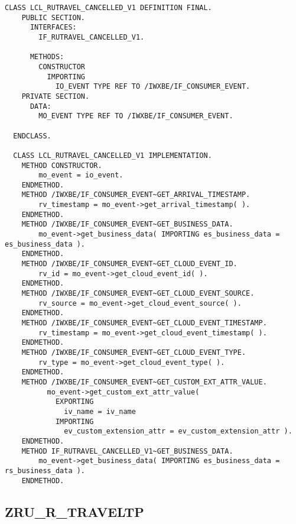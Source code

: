 \begin{Verbatim}[breaklines=true]
    CLASS LCL_RUTRAVEL_CANCELLED_V1 DEFINITION FINAL.
    PUBLIC SECTION.
      INTERFACES:
        IF_RUTRAVEL_CANCELLED_V1.
  
      METHODS:
        CONSTRUCTOR
          IMPORTING
            IO_EVENT TYPE REF TO /IWXBE/IF_CONSUMER_EVENT.
    PRIVATE SECTION.
      DATA:
        MO_EVENT TYPE REF TO /IWXBE/IF_CONSUMER_EVENT.
  
  ENDCLASS.
  
  CLASS LCL_RUTRAVEL_CANCELLED_V1 IMPLEMENTATION.
    METHOD CONSTRUCTOR.
        mo_event = io_event.
    ENDMETHOD.
    METHOD /IWXBE/IF_CONSUMER_EVENT~GET_ARRIVAL_TIMESTAMP.
        rv_timestamp = mo_event->get_arrival_timestamp( ).
    ENDMETHOD.
    METHOD /IWXBE/IF_CONSUMER_EVENT~GET_BUSINESS_DATA.
        mo_event->get_business_data( IMPORTING es_business_data = es_business_data ).
    ENDMETHOD.
    METHOD /IWXBE/IF_CONSUMER_EVENT~GET_CLOUD_EVENT_ID.
        rv_id = mo_event->get_cloud_event_id( ).
    ENDMETHOD.
    METHOD /IWXBE/IF_CONSUMER_EVENT~GET_CLOUD_EVENT_SOURCE.
        rv_source = mo_event->get_cloud_event_source( ).
    ENDMETHOD.
    METHOD /IWXBE/IF_CONSUMER_EVENT~GET_CLOUD_EVENT_TIMESTAMP.
        rv_timestamp = mo_event->get_cloud_event_timestamp( ).
    ENDMETHOD.
    METHOD /IWXBE/IF_CONSUMER_EVENT~GET_CLOUD_EVENT_TYPE.
        rv_type = mo_event->get_cloud_event_type( ).
    ENDMETHOD.
    METHOD /IWXBE/IF_CONSUMER_EVENT~GET_CUSTOM_EXT_ATTR_VALUE.
          mo_event->get_custom_ext_attr_value(
            EXPORTING
              iv_name = iv_name
            IMPORTING
              ev_custom_extension_attr = ev_custom_extension_attr ).
    ENDMETHOD.
    METHOD IF_RUTRAVEL_CANCELLED_V1~GET_BUSINESS_DATA.
        mo_event->get_business_data( IMPORTING es_business_data = rs_business_data ).
    ENDMETHOD.
\end{Verbatim}

\subsection{ ZRU\_R\_TRAVELTP} 


